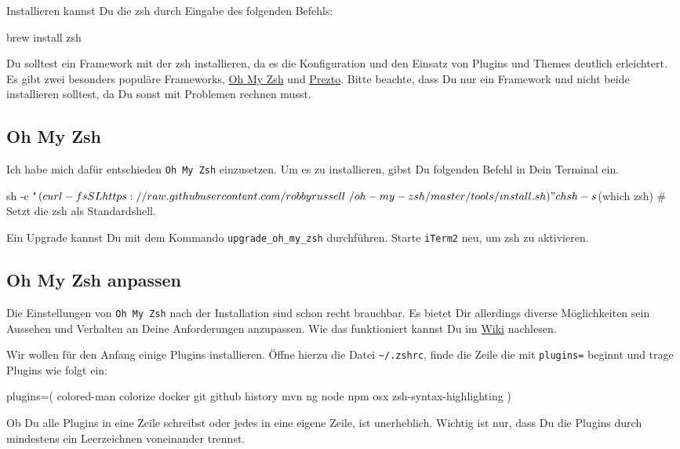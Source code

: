 \documentclass[]{article}
\newcommand{\code}[1]{\texttt{#1}}
\begin{document}
Installieren kannst Du die zsh durch Eingabe des folgenden Befehls:
\begin{bashcode}
brew install zsh
\end{bashcode}

Du solltest ein Framework mit der zsh installieren, da es die Konfiguration und den Einsatz von Plugins und Themes deutlich erleichtert. Es gibt zwei besonders populäre Frameworks, \href{https://github.com/robbyrussell/oh-my-zsh}{Oh My Zsh} und \href{https://github.com/sorin-ionescu/prezto}{Prezto}.
Bitte beachte, dass Du nur ein Framework und nicht beide installieren solltest, da Du sonst mit Problemen rechnen musst.

\subsection{Oh My Zsh}
Ich habe mich dafür entschieden \code{Oh My Zsh} einzusetzen. Um es zu installieren, gibst Du folgenden Befehl in Dein Terminal ein.
\begin{bashcode}
sh -c "$(curl -fsSL https://raw.githubusercontent.com/robbyrussell\
/oh-my-zsh/master/tools/install.sh)"
chsh -s $(which zsh) # Setzt die zsh als Standardshell.
\end{bashcode}

Ein Upgrade kannst Du mit dem Kommando \code{upgrade\_oh\_my\_zsh} durchführen. Starte \code{iTerm2} neu, um zsh zu aktivieren.

\subsection{Oh My Zsh anpassen}
Die Einstellungen von \code{Oh My Zsh} nach der Installation sind schon recht brauchbar. Es bietet Dir allerdings diverse Möglichkeiten sein Aussehen und Verhalten an Deine Anforderungen anzupassen. Wie das funktioniert kannst Du im \href{https://github.com/robbyrussell/oh-my-zsh/wiki}{Wiki} nachlesen.

Wir wollen für den Anfang einige Plugins installieren. Öffne hierzu die Datei \code{\~\//.zshrc}, finde die Zeile die mit \code{plugins=} beginnt und trage Plugins wie folgt ein:
\begin{bashcode}
plugins=(
  colored-man 
  colorize  
  docker 
  git 
  github 
  history 
  mvn 
  ng 
  node 
  npm 
  osx 
  zsh-syntax-highlighting
)
\end{bashcode}
Ob Du alle Plugins in eine Zeile schreibst oder jedes in eine eigene Zeile, ist unerheblich. Wichtig ist nur, dass Du die Plugins durch mindestens ein Leerzeichnen voneinander trennst.
\end{document}
